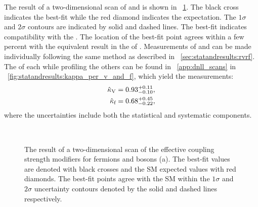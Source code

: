 The result of a two-dimensional \DNLL scan of \kf and \kV is shown in \Fig~\ref{fig:statandresults:kappa_plots_kvkf}. The black cross indicates the best-fit while the red diamond indicates the \SM expectation. The $1\sigma$ and $2\sigma$ contours are indicated by solid and dashed lines. The best-fit indicates compatibility with the \SM. The location of the best-fit point agrees within a few percent with the equivalent result in the \App of \cite{CMS-PAS-HIG-16-020}. Measurements of \kf and \kV can be made individually following the same method as described in \Sec~\ref{sec:statandresults:rvrf}. The \DNLL of each \POI while profiling the others can be found in \App~\ref{app:dnll_scans} in \Fig~\ref{fig:statandresults:kappa_per_v_and_f}, which yield the measurements:
\begin{equation*}
\begin{split}
\hat{\kappa}_{\text{V}} = 0.93^{+0.11}_{-0.10}, \\
\hat{\kappa}_{\text{f}} = 0.68^{+0.45}_{-0.22},
\end{split}
\end{equation*}
where the uncertainties include both the statistical and systematic components.
\begin{figure}[ht!]
\centering
{}\\
\caption{The result of a two-dimensional \DNLL scan of the effective coupling strength modifiers for fermions and bosons (a). The best-fit values are denoted with black crosses and the SM expected values with red diamonds. The best-fit points agree with the SM within the $1\sigma$ and $2\sigma$ uncertainty contours denoted by the solid and dashed lines respectively.}
\label{fig:statandresults:kappa_plots_kvkf}
\end{figure}

